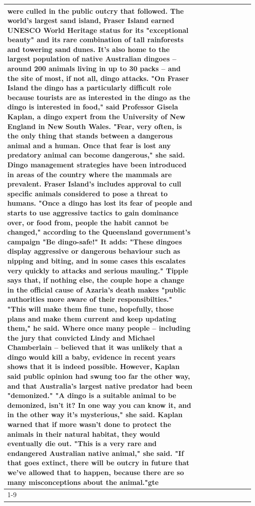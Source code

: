 \begin{table}[H]
\begin{tabular}{lllrlllll}
were culled in the public outcry that followed. The world's largest sand island, Fraser Island earned UNESCO World Heritage status for its "exceptional beauty" and its rare combination of tall rainforests and towering sand dunes. It's also home to the largest population of native Australian dingoes -- around 200 animals living in up to 30 packs -- and the site of most, if not all, dingo attacks. "On Fraser Island the dingo has a particularly difficult role because tourists are as interested in the dingo as the dingo is interested in food," said Professor Gisela Kaplan, a dingo expert from the University of New England in New South Wales. "Fear, very often, is the only thing that stands between a dangerous animal and a human. Once that fear is lost any predatory animal can become dangerous," she said. Dingo management strategies have been introduced in areas of the country where the mammals are prevalent. Fraser Island's includes approval to cull specific animals considered to pose a threat to humans. "Once a dingo has lost its fear of people and starts to use aggressive tactics to gain dominance over, or food from, people the habit cannot be changed," according to the Queensland government's campaign "Be dingo-safe!" It adds: "These dingoes display aggressive or dangerous behaviour such as nipping and biting, and in some cases this escalates very quickly to attacks and serious mauling." Tipple says that, if nothing else, the couple hope a change in the official cause of Azaria's death makes "public authorities more aware of their responsibilties." "This will make them fine tune, hopefully, those plans and make them current and keep updating them," he said. Where once many people -- including the jury that convicted Lindy and Michael Chamberlain -- believed that it was unlikely that a dingo would kill a baby, evidence in recent years shows that it is indeed possible. However, Kaplan said public opinion had swung too far the other way, and that Australia's largest native predator had been "demonized." "A dingo is a suitable animal to be demonized, isn't it? In one way you can know it, and in the other way it's mysterious," she said. Kaplan warned that if more wasn't done to protect the animals in their natural habitat, they would eventually die out. "This is a very rare and endangered Australian native animal," she said. "If that goes extinct, there will be outcry in future that we've allowed that to happen, because there are so many misconceptions about the animal."gte \\
\cline{1-9}

\end{tabular}
\end{table}

